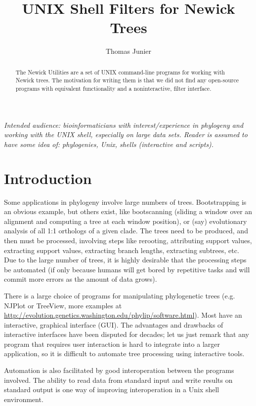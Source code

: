 \documentclass[a4paper,11pt]{article}
\title{UNIX Shell Filters for Newick Trees}
\author{Thomas Junier}
\newcommand{\gui}{\textsc{GUI}}
\newcommand{\unix}{Unix}
\begin{document}
\maketitle

\begin{abstract}
The Newick Utilities are a set of UNIX command-line programs for working with
Newick trees. The motivation for writing them is that we did not find any open-source programs with equivalent functionality and a noninteractive, filter interface.
\end{abstract}

\textit{\noindent{} Intended audience: bioinformaticians with interest/experience in phylogeny and working with the UNIX shell, especially on large data sets. Reader is assumed to have some idea of: phylogenies, Unix, shells (interactive and scripts).}
 
\section*{Introduction}

Some applications in phylogeny involve large numbers of trees. Bootstrapping is an obvious example, but others exist, like bootscanning (sliding a window over an alignment and computing a tree at each window position), or (say) evolutionary analysis of all 1:1 orthologs of a given clade. The trees need to be produced, and then must be processed, involving steps like rerooting, attributing support values, extracting support values, extracting branch lengths, extracting subtrees, etc. Due to the large number of trees, it is highly desirable that the processing steps be automated (if only because humans will get bored by repetitive tasks and will commit more errors as the amount of data grows).

There is a large choice of programs for manipulating phylogenetic trees (e.g.
NJPlot or TreeView, more examples at \url{
http://evolution.genetics.washington.edu/phylip/software.html}). Most have an interactive, graphical interface (\gui{}). The advantages and drawbacks of interactive interfaces have been disputed for decades; let us just remark that any program that requires user interaction is hard to integrate into a larger application, so it is difficult to automate tree processing using interactive tools.

Automation is also facilitated by good interoperation between the programs involved. The ability to read data from standard input and write results on standard output is one way of improving interoperation in a \unix{} shell environment. \cite{Gancarz2002}
\end{document}
